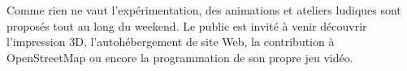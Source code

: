 \begin{minipage}{0.6\textwidth}

Comme rien ne vaut l'expérimentation, des animations et ateliers ludiques sont proposés tout au long du weekend. Le public est invité à venir découvrir l’impression 3D, l’autohébergement de site Web, la contribution à OpenStreetMap ou encore la programmation de son propre jeu vidéo.

\end{minipage}
\begin{minipage}{0.4\textwidth}
\begin{center}
\end{center}
\end{minipage}

